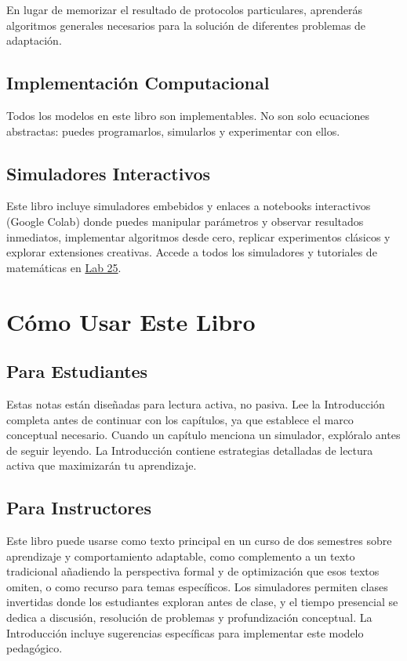 \documentclass[
  letterpaper,
  DIV=11,
  numbers=noendperiod]{scrreprt}
\begin{document}
En lugar de memorizar el resultado de protocolos particulares,
aprenderás algoritmos generales necesarios para la solución de
diferentes problemas de adaptación.

\subsection{Implementación
Computacional}\label{implementaciuxf3n-computacional}

Todos los modelos en este libro son implementables. No son solo
ecuaciones abstractas: puedes programarlos, simularlos y experimentar
con ellos.

\subsection{Simuladores Interactivos}\label{simuladores-interactivos}

Este libro incluye simuladores embebidos y enlaces a notebooks
interactivos (Google Colab) donde puedes manipular parámetros y observar
resultados inmediatos, implementar algoritmos desde cero, replicar
experimentos clásicos y explorar extensiones creativas. Accede a todos
los simuladores y tutoriales de matemáticas en
\href{https://www.bouzaslab25.com}{Lab 25}.

\section{Cómo Usar Este Libro}\label{cuxf3mo-usar-este-libro}

\subsection{Para Estudiantes}\label{para-estudiantes}

Estas notas están diseñadas para lectura activa, no pasiva. Lee la
Introducción completa antes de continuar con los capítulos, ya que
establece el marco conceptual necesario. Cuando un capítulo menciona un
simulador, explóralo antes de seguir leyendo. La Introducción contiene
estrategias detalladas de lectura activa que maximizarán tu aprendizaje.

\subsection{Para Instructores}\label{para-instructores}

Este libro puede usarse como texto principal en un curso de dos
semestres sobre aprendizaje y comportamiento adaptable, como complemento
a un texto tradicional añadiendo la perspectiva formal y de optimización
que esos textos omiten, o como recurso para temas específicos. Los
simuladores permiten clases invertidas donde los estudiantes exploran
antes de clase, y el tiempo presencial se dedica a discusión, resolución
de problemas y profundización conceptual. La Introducción incluye
sugerencias específicas para implementar este modelo pedagógico.
\end{document}
